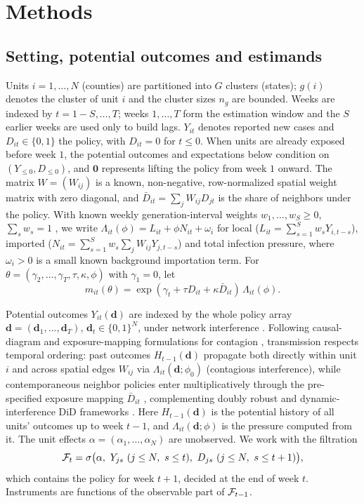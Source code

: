 \section{Methods}
\label{s:methods}

\subsection{Setting, potential outcomes and estimands}

Units $i=1,\dots,N$ (counties) are partitioned into $G$ clusters (states); $g(i)$ denotes the
cluster of unit $i$ and the cluster sizes $n_g$ are bounded. Weeks are indexed by
$t=1-S,\dots,T$; weeks $1,\dots,T$ form the estimation window and the $S$ earlier weeks are
used only to build lags. $Y_{it}$ denotes reported new cases and $D_{it}\in\{0,1\}$ the policy,
with $D_{it}=0$ for $t\le 0$. When units are already exposed before week $1$, the potential outcomes and expectations below condition on $(Y_{\le 0},D_{\le 0})$, and $\mathbf 0$ represents lifting the policy from week $1$ onward. The matrix $W=(W_{ij})$ is a known, non-negative, row-normalized
spatial weight matrix with zero diagonal, and $\bar D_{it}=\sum_j W_{ij}D_{jt}$ is the share of
neighbors under the policy. With known weekly generation-interval weights $w_1,\dots,w_S\ge 0$,
$\sum_s w_s=1$ \citep{wallinga2007generation}, we write
$\Lambda_{it}(\phi)=L_{it}+\phi N_{it}+\omega_i$ for local ($L_{it}=\sum_{s=1}^{S} w_s Y_{i,t-s}$), imported ($N_{it}=\sum_{s=1}^{S} w_s \sum_{j} W_{ij}Y_{j,t-s}$) and total infection pressure, where $\omega_i>0$ is a small known background importation term. For $\theta=(\gamma_2,\dots,\gamma_T,\tau,\kappa,\phi)$ with $\gamma_1=0$, let
\begin{equation}
m_{it}(\theta)=\exp(\gamma_t+\tau D_{it}+\kappa\bar D_{it})\,\Lambda_{it}(\phi).
\label{eq:mean}
\end{equation}

Potential outcomes $Y_{it}(\mathbf d)$ are indexed by the whole policy array
$\mathbf d=(\mathbf d_1,\dots,\mathbf d_T)$, $\mathbf d_t\in\{0,1\}^N$, under network interference
\citep{halloran1995causal,hudgens2008interference,ogburn2014causal}. Following causal-diagram
and exposure-mapping formulations for contagion \citep{cai2021contagion,forastiere2021network},
transmission respects temporal ordering: past outcomes $H_{t-1}(\mathbf d)$ propagate both directly
within unit $i$ and across spatial edges $W_{ij}$ via $\Lambda_{it}(\mathbf d;\phi_0)$ (contagious
interference), while contemporaneous neighbor policies enter multiplicatively through the
pre-specified exposure mapping $\bar D_{it}$ \citep{tchetgen2012interference,zhao2021interdependent},
complementing doubly robust and dynamic-interference DiD frameworks \citep{hettinger2025doubly,xu2023did,xu2026dynamic}.
Here $H_{t-1}(\mathbf d)$ is the potential history of all units' outcomes up to week $t-1$, and $\Lambda_{it}(\mathbf d;\phi)$ is the pressure computed
from it. The unit effects $\alpha=(\alpha_1,\dots,\alpha_N)$ are unobserved. We work with the
filtration
\[
\mathcal{F}_t=\sigma\bigl(\alpha,\ Y_{js}\ (j\le N,\ s\le t),\ D_{js}\ (j\le N,\ s\le t+1)\bigr),
\]
which contains the policy for week $t+1$, decided at the end of week $t$. Instruments are
functions of the observable part of $\mathcal{F}_{t-1}$.


